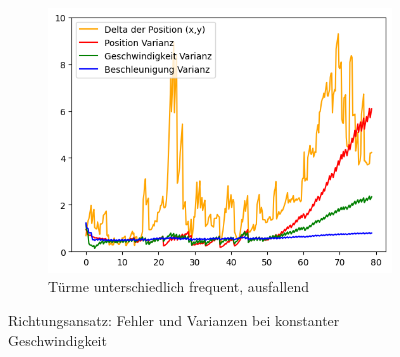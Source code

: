 \begin{figure}
\begin{subfigure}{.333\textwidth}
        \includegraphics[width=.9\linewidth]{Ergebnisse/plots_ungenauigkeiten/richtung/richtung_dyn_acc_flag_freq.png}
        \caption{Türme unterschiedlich frequent, ausfallend}
    \end{subfigure}
    \caption{Richtungsansatz: Fehler und Varianzen bei konstanter Geschwindigkeit}
    \label{abb:richtung-da-fehler}
\end{figure}